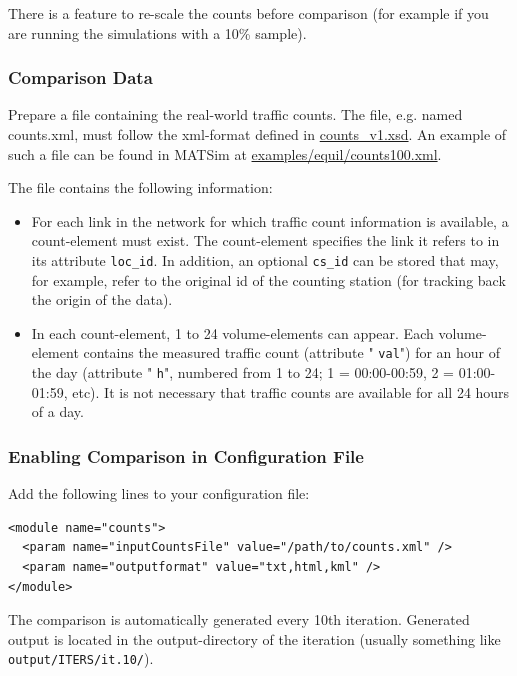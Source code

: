 There is a feature to re-scale the counts before comparison (for example if you are running the simulations with a 10\% sample).

\subsubsection{Comparison Data}

Prepare a file containing the real-world traffic counts. The file, e.g. named counts.xml, must follow the xml-format defined in \href{http://matsim.org/files/dtd/counts_v1.xsd}{counts\_v1.xsd}. An example of such a file can be found in MATSim at \href{http://matsim.svn.sourceforge.net/viewvc/matsim/matsim/trunk/examples/equil/counts100.xml?content-type=text%2Fplain}{examples/equil/counts100.xml}.

The file contains the following information:
\begin{itemize}
	\item For each link in the network for which traffic count information  is available, a count-element must exist. The count-element specifies  the link it refers to in its attribute 
\texttt{loc\_id}. In addition, an optional 
\texttt{cs\_id}  can be stored that may, for example, refer to the original id of the  counting station (for tracking back the origin of the data).
	\item In each count-element, 1 to 24 volume-elements can appear. Each volume-element contains the measured traffic count (attribute "
\texttt{val}") for an hour of the day (attribute "
\texttt{h}",  numbered from 1 to 24; 1 = 00:00-00:59, 2 = 01:00-01:59, etc). It is  not necessary that traffic counts are available for all 24 hours of a  day.
\end{itemize}


\subsubsection{Enabling Comparison in Configuration File}

Add the following lines to your configuration file:
\begin{lstlisting}
<module name="counts">
  <param name="inputCountsFile" value="/path/to/counts.xml" />
  <param name="outputformat" value="txt,html,kml" />
</module>

\end{lstlisting}

The comparison is automatically generated every 10th iteration.  Generated output is located in the output-directory of the iteration  (usually something like
\texttt{output/ITERS/it.10/}).


